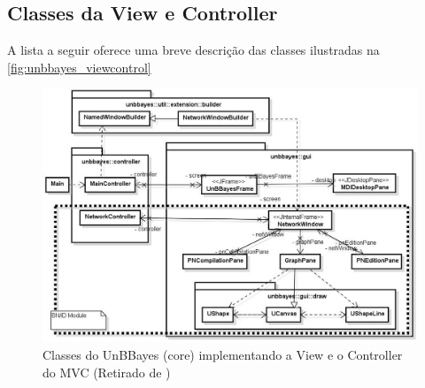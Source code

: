 \subsection{Classes da View e Controller}
A lista a seguir oferece uma breve descrição das classes ilustradas na \autoref{fig:unbbayes_viewcontrol}
\begin{figure}[ht]
	\centering
	\includegraphics[width = 450px]{figuras/unbbayes_viewcontrol}
	\caption[UnBBayes View e Controller]{Classes do UnBBayes (core) implementando a View e o Controller do MVC (Retirado de \cite{javaApi11})}
	\label{fig:unbbayes_viewcontrol}
\end{figure}
